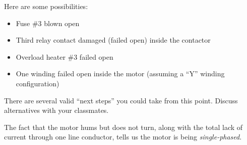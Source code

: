 





Here are some possibilities:

\begin{itemize}
\item{} Fuse \#3 blown open
\item{} Third relay contact damaged (failed open) inside the contactor
\item{} Overload heater \#3 failed open
\item{} One winding failed open inside the motor (assuming a ``Y'' winding configuration)
\end{itemize}

There are several valid ``next steps'' you could take from this point.  Discuss alternatives with your classmates.







The fact that the motor hums but does not turn, along with the total lack of current through one line conductor, tells us the motor is being {\it single-phased}.




